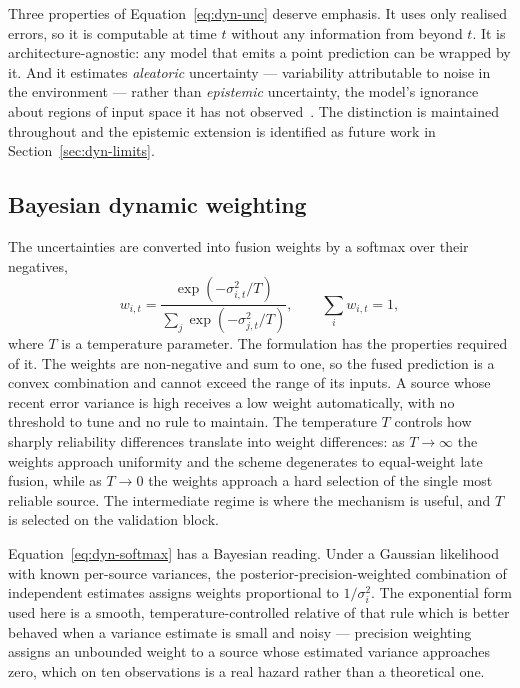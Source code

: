 Three properties of Equation~\eqref{eq:dyn-unc} deserve emphasis. It uses only realised errors,
so it is computable at time $t$ without any information from beyond $t$. It is
architecture-agnostic: any model that emits a point prediction can be wrapped by it. And it
estimates \emph{aleatoric} uncertainty --- variability attributable to noise in the environment
--- rather than \emph{epistemic} uncertainty, the model's ignorance about regions of input space
it has not observed~\cite{gal2016dropout,kendall2017}. The distinction is maintained throughout
and the epistemic extension is identified as future work in Section~\ref{sec:dyn-limits}.

\subsection{Bayesian dynamic weighting}

The uncertainties are converted into fusion weights by a softmax over their negatives,
\begin{equation}
w_{i,t} = \frac{\exp\!\left(-\sigma_{i,t}^2 / T\right)}
               {\sum_{j} \exp\!\left(-\sigma_{j,t}^2 / T\right)},
\qquad
\sum_i w_{i,t} = 1,
\label{eq:dyn-softmax}
\end{equation}
where $T$ is a temperature parameter. The formulation has the properties required of it. The
weights are non-negative and sum to one, so the fused prediction is a convex combination and
cannot exceed the range of its inputs. A source whose recent error variance is high receives a
low weight automatically, with no threshold to tune and no rule to maintain. The temperature $T$
controls how sharply reliability differences translate into weight differences: as
$T \to \infty$ the weights approach uniformity and the scheme degenerates to equal-weight late
fusion, while as $T \to 0$ the weights approach a hard selection of the single most reliable
source. The intermediate regime is where the mechanism is useful, and $T$ is selected on the
validation block.

Equation~\eqref{eq:dyn-softmax} has a Bayesian reading. Under a Gaussian likelihood with known
per-source variances, the posterior-precision-weighted combination of independent estimates
assigns weights proportional to $1/\sigma_i^2$. The exponential form used here is a smooth,
temperature-controlled relative of that rule which is better behaved when a variance estimate is
small and noisy --- precision weighting assigns an unbounded weight to a source whose estimated
variance approaches zero, which on ten observations is a real hazard rather than a theoretical
one.


